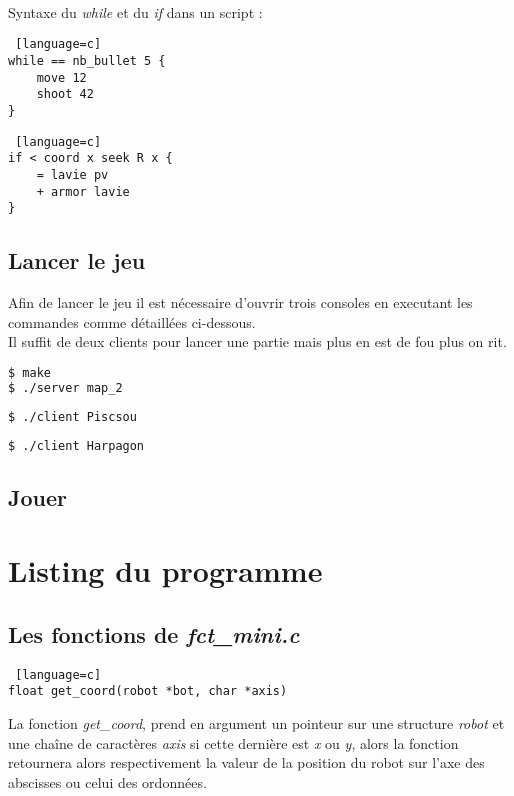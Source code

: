 \documentclass[a4paper, 11pt]{article}
\begin{document}
\\\\\\
Syntaxe du \emph{while} et du \emph{if} dans un script :
\begin {lstlisting} [language=c]
while == nb_bullet 5 {
	move 12
	shoot 42
}
\end{lstlisting}

\begin {lstlisting} [language=c]
if < coord x seek R x {
	= lavie pv
	+ armor lavie
}
\end{lstlisting}

\subsection{Lancer le jeu}
Afin de lancer le jeu il est nécessaire d'ouvrir trois consoles en executant les commandes comme détaillées ci-dessous.\\
Il suffit de deux clients pour lancer une partie mais plus en est de fou plus on rit.
\begin {lstlisting}[language=bash,title={Console - Serveur}]
$ make
$ ./server map_2
\end{lstlisting}
\begin {lstlisting}[language=bash,title={Console - Client 2}]
$ ./client Piscsou
\end{lstlisting}
\begin {lstlisting}[language=bash,title={Console - Client 3}]
$ ./client Harpagon
\end{lstlisting}

\subsection{Jouer}

\newpage
\section{Listing du programme}
\subsection{Les fonctions de \emph{fct\_mini.c}}
\begin {lstlisting} [language=c]
float get_coord(robot *bot, char *axis)
\end{lstlisting}
La fonction \emph{get\_coord}, prend en argument un pointeur sur une structure \emph{robot} et une chaîne de caractères \emph{axis} si cette dernière est \emph{x} ou \emph{y}, alors la fonction retournera alors respectivement la valeur de la position du robot sur l'axe des abscisses ou celui des ordonnées.\\
\end{document}
